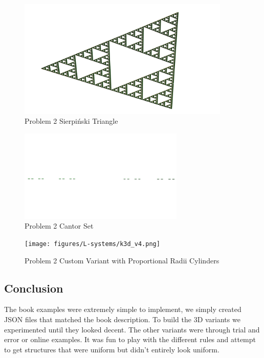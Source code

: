 \begin{figure}[H]
    \centering
    \includegraphics[width=0.90\textwidth]{figures/L-systems/sierpinski.png}
    \caption{Problem 2 Sierpiński Triangle}\label{fig:sierpinski}
\end{figure}

\begin{figure}[H]
    \centering
    \includegraphics[width=0.70\textwidth]{figures/L-systems/cantor.png}
    \caption{Problem 2 Cantor Set}\label{fig:cantor}
\end{figure}

\begin{figure}[H]
    \centering
    \texttt{[image: figures/L-systems/k3d\_v4.png]}
    \caption{Problem 2 Custom Variant with Proportional Radii Cylinders}\label{fig:k3d_v4}
\end{figure}

\subsection{Conclusion}
The book examples were extremely simple to implement, we simply
created JSON files that matched the book description. To build the 3D
variants we experimented until they looked decent. The other variants were
through trial and error or online examples. It was fun to play with the
different rules and attempt to get structures that were uniform but didn't
entirely look uniform.
